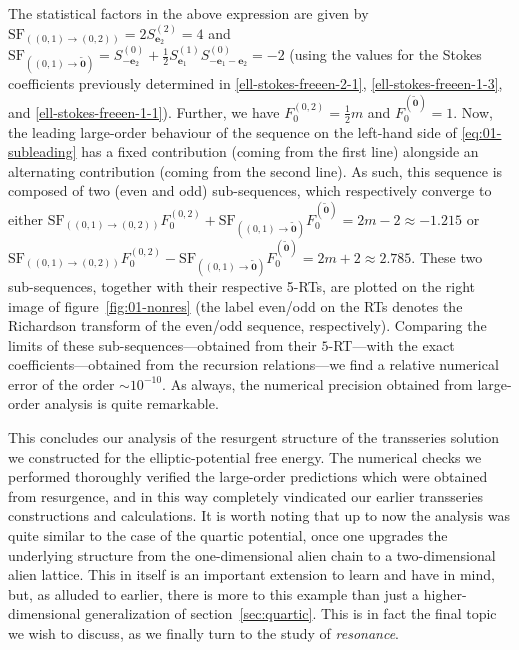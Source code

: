 \documentclass[11pt,a4paper]{article}
\begin{document}
%
\noindent
The statistical factors in the above expression are given by $\mathrm{SF}_{( (0,1) \rightarrow (0,2) )} = 2 S^{(2)}_{\boldsymbol{e}_2} = 4$ and $\mathrm{SF}_{( (0,1) \rightarrow \widetilde{\boldsymbol{0}} )} = S^{(0)}_{-\boldsymbol{e}_2} + \frac{1}{2}S^{(1)}_{\boldsymbol{e}_1} S^{(0)}_{-\boldsymbol{e}_1-\boldsymbol{e}_2} = -2$ (using the values for the Stokes coefficients previously determined in \eqref{ell-stokes-freeen-2-1}, \eqref{ell-stokes-freeen-1-3}, and \eqref{ell-stokes-freeen-1-1}). Further, we have $F_0^{(0,2)} = \frac{1}{2}m$ and $F_0^{(\widetilde{\boldsymbol{0}})} = 1$. Now, the leading large-order behaviour of the sequence on the left-hand side of \eqref{eq:01-subleading} has a fixed contribution (coming from the first line) alongside an alternating contribution (coming from the second line). As such, this sequence is composed of two (even and odd) sub-sequences, which respectively converge to either $\mathrm{SF}_{( (0,1) \rightarrow (0,2) )} F^{(0,2)}_0 + \mathrm{SF}_{( (0,1) \rightarrow \widetilde{\boldsymbol{0}} )} F_0^{(\widetilde{\boldsymbol{0}})} = 2 m - 2 \approx -1.215$ or $\mathrm{SF}_{( (0,1) \rightarrow (0,2) )} F^{(0,2)}_0 - \mathrm{SF}_{( (0,1) \rightarrow \widetilde{\boldsymbol{0}} )} F_0^{(\widetilde{\boldsymbol{0}})} = 2 m + 2 \approx 2.785$. These two sub-sequences, together with their respective 5-RTs, are plotted on the right image of figure~\ref{fig:01-nonres} (the label even/odd on the RTs denotes the Richardson transform of the even/odd sequence, respectively). Comparing the limits of these sub-sequences---obtained from their $5$-RT---with the exact coefficients---obtained from the recursion relations---we find a relative numerical error of the order $\sim 10^{-10}$. As always, the numerical precision obtained from large-order analysis is quite remarkable. 

This concludes our analysis of the resurgent structure of the transseries solution we constructed for the elliptic-potential free energy. The numerical checks we performed thoroughly verified the large-order predictions which were obtained from resurgence, and in this way completely vindicated our earlier transseries constructions and calculations. It is worth noting that up to now the analysis was quite similar to the case of the quartic potential, once one upgrades the underlying structure from the one-dimensional alien chain to a two-dimensional alien lattice. This in itself is an important extension to learn and have in mind, but, as alluded to earlier, there is more to this example than just a higher-dimensional generalization of section~\ref{sec:quartic}. This is in fact the final topic we wish to discuss, as we finally turn to the study of \textit{resonance}.
\end{document}

